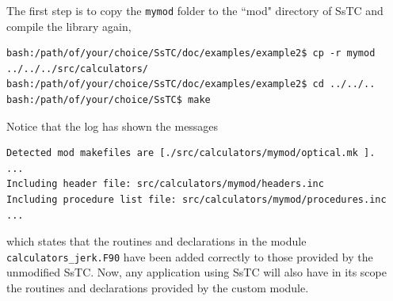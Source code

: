 \documentclass[10pt,a4paper]{article}
\begin{document}
The first step is to copy the \verb|mymod| folder to the ``mod" directory of SsTC and compile the library again,
\begin{codebox}{}
\begin{verbatim}
bash:/path/of/your/choice/SsTC/doc/examples/example2$ cp -r mymod
../../../src/calculators/
bash:/path/of/your/choice/SsTC/doc/examples/example2$ cd ../../..
bash:/path/of/your/choice/SsTC$ make
\end{verbatim}
\end{codebox}
Notice that the log has shown the messages
\begin{codebox}{}
\begin{verbatim}
Detected mod makefiles are [./src/calculators/mymod/optical.mk ].
...
Including header file: src/calculators/mymod/headers.inc
Including procedure list file: src/calculators/mymod/procedures.inc
...
\end{verbatim}
\end{codebox}
which states that the routines and declarations in the module \verb|calculators_jerk.F90| have been added correctly to those provided by the unmodified SsTC. Now, any application using SsTC will also have in its scope the routines and declarations provided by the custom module.
\end{document}
